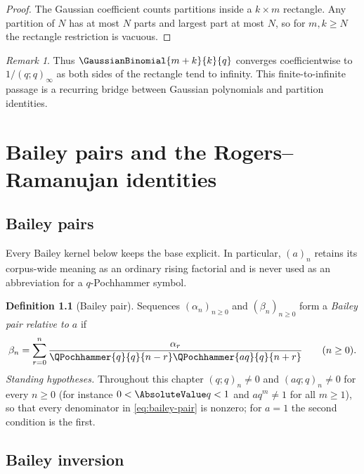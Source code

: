 \documentclass[11pt,a4paper,oneside,openany]{book}
\theoremstyle{definition}
\newtheorem{definition}[definition]{Definition}
\theoremstyle{remark}
\newtheorem{remark}[remark]{Remark}
\begin{document}
\begin{proof}
The Gaussian coefficient counts partitions inside a $k\times m$ rectangle.  Any partition of $N$ has at most $N$ parts and largest part at most $N$, so for $m,k\ge N$ the rectangle restriction is vacuous.
\end{proof}

\begin{remark}
Thus $\GaussianBinomial{m+k}{k}{q}$ converges coefficientwise to $1/(q;q)_\infty$ as both sides of the rectangle tend to infinity.  This finite-to-infinite passage is a recurring bridge between Gaussian polynomials and partition identities.
\end{remark}

\chapter{Bailey pairs and the Rogers--Ramanujan identities}\label{chap:bailey}

\section{Bailey pairs}

Every Bailey kernel below keeps the base explicit.  In particular,
$(a)_n$ retains its corpus-wide meaning as an ordinary rising factorial and
is never used as an abbreviation for a $q$-Pochhammer symbol.

\begin{definition}[Bailey pair]\label{qg:def-bailey-pair}
Sequences $(\alpha_n)_{n\ge0}$ and $(\beta_n)_{n\ge0}$ form a \emph{Bailey pair relative to $a$} if
\begin{equation}\label{eq:bailey-pair}
 \beta_n=\sum_{r=0}^{n}
 \frac{\alpha_r}
      {\QPochhammer{q}{q}{n-r}\QPochhammer{aq}{q}{n+r}}
 \qquad(n\ge0).
\end{equation}
\emph{Standing hypotheses.}  Throughout this chapter $(q;q)_n\ne0$ and
$(aq;q)_n\ne0$ for every $n\ge0$ (for instance $0<\AbsoluteValue q<1$ and
$aq^m\ne1$ for all $m\ge1$), so that every denominator in
\eqref{eq:bailey-pair} is nonzero; for $a=1$ the second condition is the
first.
\end{definition}

\section{Bailey inversion}
\end{document}
